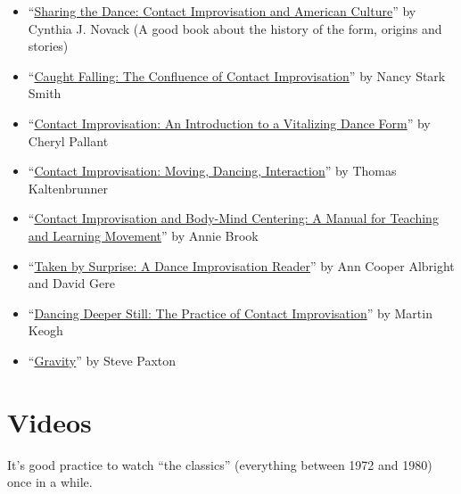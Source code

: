 \begin{itemize}
    \setlength\itemsep{0em}
    \item ``\href{https://www.amazon.com/Sharing-Dance-Improvisation-Directions-Anthropological/dp/0299124444}{Sharing the Dance: Contact Improvisation and American Culture}'' by Cynthia J. Novack (A good book about the history of the form, origins and stories)
    \item ``\href{https://www.amazon.com/Caught-Falling-Confluence-Contact-Improvisation/dp/0937645095}{Caught Falling: The Confluence of Contact Improvisation}'' by Nancy Stark Smith
    \item ``\href{https://www.amazon.com/Contact-Improvisation-Introduction-Vitalizing-Dance/dp/0786426470}{Contact Improvisation: An Introduction to a Vitalizing Dance Form}'' by Cheryl Pallant
    \item ``\href{https://www.amazon.com/Contact-Improvisation-Dancing-Interaction-Introduction/dp/1841261386}{Contact Improvisation: Moving, Dancing, Interaction}'' by Thomas Kaltenbrunner
    \item ``\href{https://www.amazon.com/Improvisation-Body-Mind-Centering-Teaching-Learning/dp/0976044900}{Contact Improvisation and Body-Mind Centering: A Manual for Teaching and Learning Movement}'' by Annie Brook
    \item ``\href{https://www.amazon.com/Taken-Surprise-Dance-Improvisation-Reader/dp/0819566489}{Taken by Surprise: A Dance Improvisation Reader}'' by Ann Cooper Albright and David Gere
    \item ``\href{https://www.amazon.com/Dancing-Deeper-Still-Practice-Improvisation/dp/1775243044}{Dancing Deeper Still: The Practice of Contact Improvisation}'' by Martin Keogh
    \item ``\href{https://contredanse.org/en/product/gravity/}{Gravity}'' by Steve Paxton
\end{itemize}

\section{Videos}\label{sec:videos}

It's good practice to watch ``the classics'' (everything between 1972 and 1980) once in a while.

